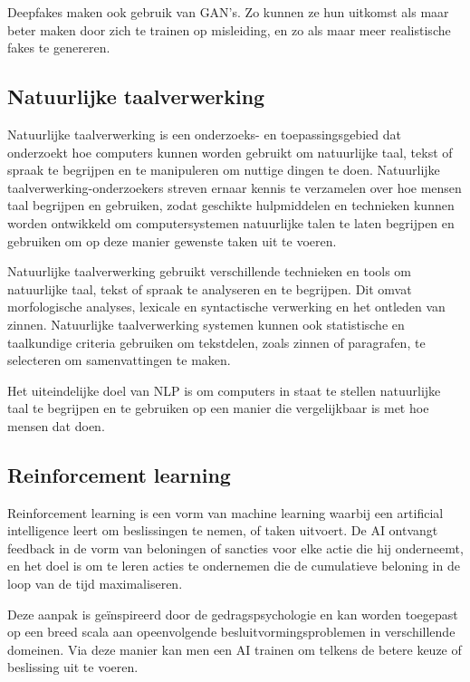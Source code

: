 \cite{laino2022generative}

Deepfakes maken ook gebruik van GAN's. Zo kunnen ze hun uitkomst als maar beter maken door zich te trainen op misleiding, en zo als maar meer realistische fakes te genereren.

\subsection{Natuurlijke taalverwerking}

Natuurlijke taalverwerking is een onderzoeks- en toepassingsgebied dat onderzoekt hoe computers kunnen worden gebruikt om natuurlijke taal, tekst of spraak te begrijpen en te manipuleren om nuttige dingen te doen. Natuurlijke taalverwerking-onderzoekers streven ernaar kennis te verzamelen over hoe mensen taal begrijpen en gebruiken, zodat geschikte hulpmiddelen en technieken kunnen worden ontwikkeld om computersystemen natuurlijke talen te laten begrijpen en gebruiken om op deze manier gewenste taken uit te voeren.

Natuurlijke taalverwerking gebruikt verschillende technieken en tools om natuurlijke taal, tekst of spraak te analyseren en te begrijpen. Dit omvat morfologische analyses, lexicale en syntactische verwerking en het ontleden van zinnen. Natuurlijke taalverwerking systemen kunnen ook statistische en taalkundige criteria gebruiken om tekstdelen, zoals zinnen of paragrafen, te selecteren om samenvattingen te maken. 

Het uiteindelijke doel van NLP is om computers in staat te stellen natuurlijke taal te begrijpen en te gebruiken op een manier die vergelijkbaar is met hoe mensen dat doen.

\cite{chowdhary2020natural}

\subsection{Reinforcement learning}

Reinforcement learning is een vorm van machine learning waarbij een artificial intelligence leert om beslissingen te nemen, of taken uitvoert. De AI ontvangt feedback in de vorm van beloningen of sancties voor elke actie die hij onderneemt, en het doel is om te leren acties te ondernemen die de cumulatieve beloning in de loop van de tijd maximaliseren. 

Deze aanpak is geïnspireerd door de gedragspsychologie en kan worden toegepast op een breed scala aan opeenvolgende besluitvormingsproblemen in verschillende domeinen. Via deze manier kan men een AI trainen om telkens de betere keuze of beslissing uit te voeren.

